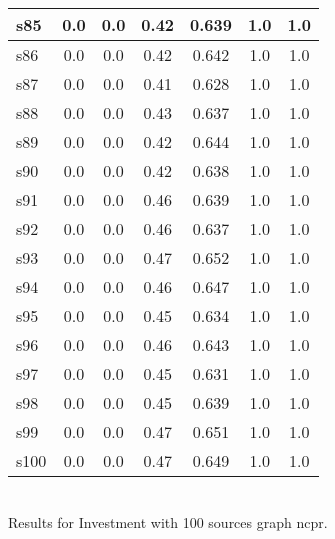 \documentclass{article}
\begin{document}
\begin{tabular}{|l|c|c|c|c|c|c|}
\hline
s85 &0.0 & 0.0 & 0.42 & 0.639 & 1.0 & 1.0\\
\hline
s86 &0.0 & 0.0 & 0.42 & 0.642 & 1.0 & 1.0\\
\hline
s87 &0.0 & 0.0 & 0.41 & 0.628 & 1.0 & 1.0\\
\hline
s88 &0.0 & 0.0 & 0.43 & 0.637 & 1.0 & 1.0\\
\hline
s89 &0.0 & 0.0 & 0.42 & 0.644 & 1.0 & 1.0\\
\hline
s90 &0.0 & 0.0 & 0.42 & 0.638 & 1.0 & 1.0\\
\hline
s91 &0.0 & 0.0 & 0.46 & 0.639 & 1.0 & 1.0\\
\hline
s92 &0.0 & 0.0 & 0.46 & 0.637 & 1.0 & 1.0\\
\hline
s93 &0.0 & 0.0 & 0.47 & 0.652 & 1.0 & 1.0\\
\hline
s94 &0.0 & 0.0 & 0.46 & 0.647 & 1.0 & 1.0\\
\hline
s95 &0.0 & 0.0 & 0.45 & 0.634 & 1.0 & 1.0\\
\hline
s96 &0.0 & 0.0 & 0.46 & 0.643 & 1.0 & 1.0\\
\hline
s97 &0.0 & 0.0 & 0.45 & 0.631 & 1.0 & 1.0\\
\hline
s98 &0.0 & 0.0 & 0.45 & 0.639 & 1.0 & 1.0\\
\hline
s99 &0.0 & 0.0 & 0.47 & 0.651 & 1.0 & 1.0\\
\hline
s100 &0.0 & 0.0 & 0.47 & 0.649 & 1.0 & 1.0\\
\hline
\end{tabular}\\

\noindent Results for Investment with 100 sources graph ncpr.
\end{document}
